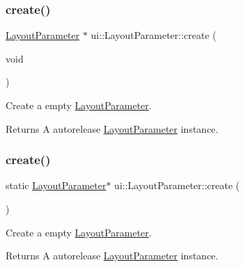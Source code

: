 \subsubsection{\texorpdfstring{create()}{create()}\hspace{0.1cm}{\footnotesize\ttfamily [1/2]}}
{\footnotesize\ttfamily \hyperlink{classui_1_1LayoutParameter}{Layout\+Parameter} $\ast$ ui\+::\+Layout\+Parameter\+::create (\begin{DoxyParamCaption}\item[{void}]{ }\end{DoxyParamCaption})\hspace{0.3cm}{\ttfamily [static]}}

Create a empty \hyperlink{classui_1_1LayoutParameter}{Layout\+Parameter}. \begin{DoxyReturn}{Returns}
A autorelease \hyperlink{classui_1_1LayoutParameter}{Layout\+Parameter} instance. 
\end{DoxyReturn}
\mbox{\label{classui_1_1LayoutParameter_ae68b022ea4ef24037de724279a285428}} 
\subsubsection{\texorpdfstring{create()}{create()}\hspace{0.1cm}{\footnotesize\ttfamily [2/2]}}
{\footnotesize\ttfamily static \hyperlink{classui_1_1LayoutParameter}{Layout\+Parameter}$\ast$ ui\+::\+Layout\+Parameter\+::create (\begin{DoxyParamCaption}{ }\end{DoxyParamCaption})\hspace{0.3cm}{\ttfamily [static]}}

Create a empty \hyperlink{classui_1_1LayoutParameter}{Layout\+Parameter}. \begin{DoxyReturn}{Returns}
A autorelease \hyperlink{classui_1_1LayoutParameter}{Layout\+Parameter} instance. 
\end{DoxyReturn}
\mbox{\label{classui_1_1LayoutParameter_a6ca908e0dd4f85238894b28d5d816974}} 
